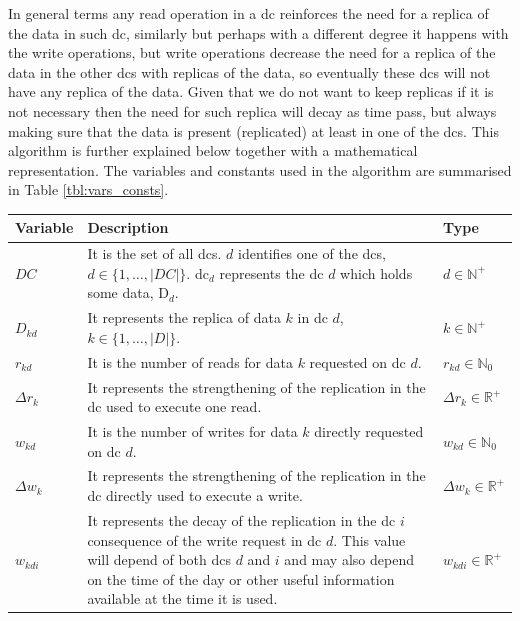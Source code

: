 \documentclass{acm_proc_article-sp}
\begin{document}
In general terms any read operation in a \gls{dc} reinforces the need for a replica of the data in such \gls{dc}, similarly but perhaps with a different degree it happens with the write operations, but write operations decrease the need for a replica of the data in the other \glspl{dc} with replicas of the data, so eventually these \glspl{dc} will not have any replica of the data. Given that we do not want to keep replicas if it is not necessary then the need for such replica will decay as time pass, but always making sure that the data is present (replicated) at least in one of the \glspl{dc}. This algorithm is further explained below together with a mathematical representation. The variables and constants used in the algorithm are summarised in Table \ref{tbl:vars_consts}.
\begin{table}[ht!]
	\begin{tabular}{ |l|p{13.5cm}|l|}
		\hline
		{\bf Variable}    & {\bf Description} & {\bf Type} \\
		\hline
		\hline
		$DC$                & It is the set of all \glspl{dc}. $d$ identifies one of the \glspl{dc}, $d \in \{1,\dots, |DC|\}$. \gls{dc}$_{d}$ represents the \gls{dc} $d$ which holds some data, D$_{d}$. &  $d \in \mathbb{N}^{+}$ \\
		\hline
		$D_{kd}$           & It represents the replica of data $k$ in \gls{dc} $d$, $k \in \{1,\dots, |D|\}$. & $k \in \mathbb{N}^{+}$ \\
		\hline
		$r_{kd}$            & It is the number of reads for data $k$ requested on \gls{dc} $d$. & $r_{kd} \in \mathbb{N}_{0}$ \\
		\hline
		$\Delta r_{k}$   & It represents the strengthening of the replication in the \gls{dc} used to execute one read. & $\Delta r_{k} \in \mathbb{R}^{+}$ \\
		\hline
		$w_{kd}$           & It is the number of writes for data $k$ directly requested on \gls{dc} $d$. & $w_{kd}\in \mathbb{N}_{0}$ \\
		\hline
		$\Delta w_{k}$  & It represents the strengthening of the replication in the \gls{dc} directly used to execute a write. & $\Delta w_{k} \in \mathbb{R}^{+}$ \\
		\hline
		$w_{kdi}$          & It represents the decay of the replication in the \gls{dc} $i$ consequence of the write request in \gls{dc} $d$. This value will depend of both \glspl{dc} $d$ and $i$ and may also depend on the time of the day or other useful information available at the time it is used. & $w_{kdi} \in \mathbb{R}^{+}$ \\

\end{tabular}
\end{table}
\end{document}
